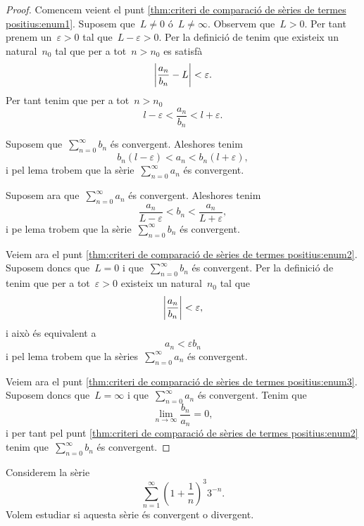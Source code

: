 \documentclass[../../main.tex]{subfiles}
\begin{document}
    \begin{proof}
        Comencem veient el punt \eqref{thm:criteri de comparació de sèries de termes positius:enum1}.
        Suposem que~\(L\neq0\) ó~\(L\neq\infty\).
        Observem que~\(L>0\).
        Per tant prenem un~\(\varepsilon>0\) tal que~\(L-\varepsilon>0\).
        Per la definició de  tenim que existeix un natural~\(n_{0}\) tal que per a tot~\(n>n_{0}\) es satisfà
        \[
            \abs{\frac{a_{n}}{b_{n}}-L}<\varepsilon.
        \]
        Per tant tenim que per a tot~\(n>n_{0}\)
        \[
            l-\varepsilon<\frac{a_{n}}{b_{n}}<l+\varepsilon.
        \]

        Suposem que~\(\sum_{n=0}^{\infty}b_{n}\) és convergent.
        Aleshores tenim
        \[
            b_{n}(l-\varepsilon)<a_{n}<b_{n}(l+\varepsilon),
        \]
        i pel lema  trobem que la sèrie~\(\sum_{n=0}^{\infty}a_{n}\) és convergent.

        Suposem ara que~\(\sum_{n=0}^{\infty}a_{n}\) és convergent.
        Aleshores tenim
        \[
            \frac{a_{n}}{L-\varepsilon}<b_{n}<\frac{a_{n}}{L+\varepsilon},
        \]
        i pe lema  trobem que la sèrie~\(\sum_{n=0}^{\infty}b_{n}\) és convergent.

        Veiem ara el punt \eqref{thm:criteri de comparació de sèries de termes positius:enum2}.
        Suposem doncs que~\(L=0\) i que~\(\sum_{n=0}^{\infty}b_{n}\) és convergent.
        Per la definició de  tenim que per a tot~\(\varepsilon>0\) existeix un natural~\(n_{0}\) tal que
        \[
            \abs{\frac{a_{n}}{b_{n}}}<\varepsilon,
        \]
        i això és equivalent a
        \[
            a_{n}<\varepsilon b_{n}
        \]
        i pel lema  trobem que la sèries~\(\sum_{n=0}^{\infty}a_{n}\) és convergent.

        Veiem ara el punt \eqref{thm:criteri de comparació de sèries de termes positius:enum3}.
        Suposem doncs que~\(L=\infty\) i que~\(\sum_{n=0}^{\infty}a_{n}\) és convergent.
        Tenim que
        \[
            \lim_{n\to\infty}\frac{b_{n}}{a_{n}}=0,
        \] %
        i per tant pel punt \eqref{thm:criteri de comparació de sèries de termes positius:enum2} tenim que~\(\sum_{n=0}^{\infty}b_{n}\) és convergent.
    \end{proof}
    \begin{example}
        Considerem la sèrie
        \[
            \sum_{n=1}^{\infty}\left(1+\frac{1}{n}\right)^{3}3^{-n}.
        \]
        Volem estudiar si aquesta sèrie és convergent o divergent.
    \end{example}
\end{document}
